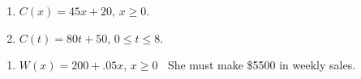 \documentclass{ximera}
\begin{document}
\begin{multicols}{2}
\begin{enumerate}
\setcounter{enumi}{\value{HW}}


\item  $C(x) = 45x+20$, $x \geq 0$.
\item  $C(t) = 80t + 50$,  $0 \leq t \leq 8$.
\setcounter{HW}{\value{enumi}}
\end{enumerate}
\end{multicols}


\begin{enumerate}
\setcounter{enumi}{\value{HW}}


\item  $W(x) = 200 + .05x,\, x \geq 0\;\;$ She must make \$5500 in weekly sales.

\setcounter{HW}{\value{enumi}}
\end{enumerate}
\end{document}
